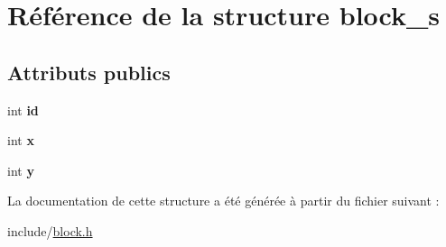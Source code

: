 \hypertarget{structblock__s}{}\section{Référence de la structure block\+\_\+s}
\label{structblock__s}
\subsection*{Attributs publics}
\begin{DoxyCompactItemize}
\item 
\mbox{\label{structblock__s_aa9dd98ce8df8bed4703396a0618131d8}} 
int {\bfseries id}
\item 
\mbox{\label{structblock__s_a78f591039c69f901f75461990bd0e343}} 
int {\bfseries x}
\item 
\mbox{\label{structblock__s_a03e2e847627473292542d6dcd3677ad2}} 
int {\bfseries y}
\end{DoxyCompactItemize}


La documentation de cette structure a été générée à partir du fichier suivant \+:\begin{DoxyCompactItemize}
\item 
include/\hyperlink{block_8h}{block.\+h}\end{DoxyCompactItemize}

